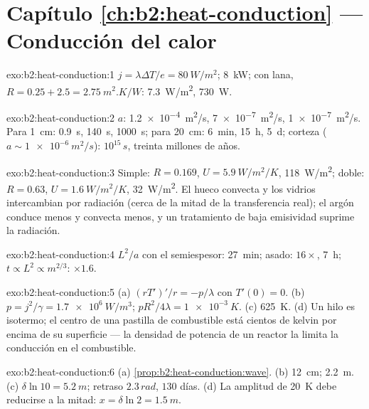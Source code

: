 \section*{Capítulo \ref{ch:b2:heat-conduction} --- Conducción del calor}

\begin{solution}{exo:b2:heat-conduction:1}
$j = \lambda\Delta T/e = \qty{80}{W/m^2}$; \qty{8}{kW}; con lana, $R = 0.25 + 2.5 =
\qty{2.75}{m^2.K/W}$: \qty{7.3}{W/m^2}, \qty{730}{W}.
\end{solution}

\begin{solution}{exo:b2:heat-conduction:2}
$a$: \qty{1.2e-4}{m^2/s}, \qty{7e-7}{m^2/s}, \qty{1e-7}{m^2/s}. Para \qty{1}{cm}:
\qty{0.9}{s}, \qty{140}{s}, \qty{1000}{s}; para \qty{20}{cm}: \qty{6}{min}, \qty{15}{h},
\qty{5}{d}; corteza ($a \sim \qty{1e-6}{m^2/s}$): $10^{15}\,\unit{s}$, treinta
millones de años.
\end{solution}

\begin{solution}{exo:b2:heat-conduction:3}
Simple: $R = 0.169$, $U = \qty{5.9}{W/m^2/K}$, \qty{118}{W/m^2}; doble: $R =
0.63$, $U = \qty{1.6}{W/m^2/K}$, \qty{32}{W/m^2}. El hueco convecta y los vidrios
intercambian por radiación (cerca de la mitad de la transferencia real); el argón conduce
menos y convecta menos, y un tratamiento de baja emisividad suprime la
radiación.
\end{solution}

\begin{solution}{exo:b2:heat-conduction:4}
$L^2/a$ con el semiespesor: \qty{27}{min}; asado: $16\times$, \qty{7}{h};
$t \propto L^2 \propto m^{2/3}$: $\times 1.6$.
\end{solution}

\begin{solution}{exo:b2:heat-conduction:5}
(a) $(rT')'/r = -p/\lambda$ con $T'(0) = 0$. (b) $p = j^2/\gamma = \qty{1.7e6}{W/m^3}$;
$pR^2/4\lambda = \qty{1e-3}{K}$. (c) \qty{625}{K}. (d) Un hilo es isotermo; el centro de una
pastilla de combustible está cientos de kelvin por encima de su superficie --- la densidad
de potencia de un reactor la limita la conducción en el combustible.
\end{solution}

\begin{solution}{exo:b2:heat-conduction:6}
(a) \cref{prop:b2:heat-conduction:wave}. (b) \qty{12}{cm}; \qty{2.2}{m}. (c)
$\delta\ln 10 = \qty{5.2}{m}$; retraso $2.3\,\unit{rad}$, $130$ días. (d) La
amplitud de \qty{20}{K} debe reducirse a la mitad: $x = \delta\ln 2 = \qty{1.5}{m}$.
\end{solution}

